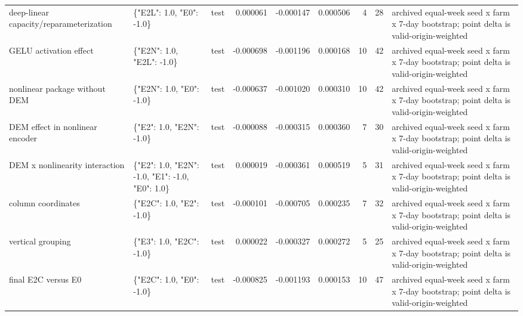 \begin{tabular}{lllrrrrrl}
deep-linear capacity/reparameterization & \{"E2L": 1.0, "E0": -1.0\} & test & 0.000061 & -0.000147 & 0.000506 & 4 & 28 & archived equal-week seed x farm x 7-day bootstrap; point delta is valid-origin-weighted \\
GELU activation effect & \{"E2N": 1.0, "E2L": -1.0\} & test & -0.000698 & -0.001196 & 0.000168 & 10 & 42 & archived equal-week seed x farm x 7-day bootstrap; point delta is valid-origin-weighted \\
nonlinear package without DEM & \{"E2N": 1.0, "E0": -1.0\} & test & -0.000637 & -0.001020 & 0.000310 & 10 & 42 & archived equal-week seed x farm x 7-day bootstrap; point delta is valid-origin-weighted \\
DEM effect in nonlinear encoder & \{"E2": 1.0, "E2N": -1.0\} & test & -0.000088 & -0.000315 & 0.000360 & 7 & 30 & archived equal-week seed x farm x 7-day bootstrap; point delta is valid-origin-weighted \\
DEM x nonlinearity interaction & \{"E2": 1.0, "E2N": -1.0, "E1": -1.0, "E0": 1.0\} & test & 0.000019 & -0.000361 & 0.000519 & 5 & 31 & archived equal-week seed x farm x 7-day bootstrap; point delta is valid-origin-weighted \\
column coordinates & \{"E2C": 1.0, "E2": -1.0\} & test & -0.000101 & -0.000705 & 0.000235 & 7 & 32 & archived equal-week seed x farm x 7-day bootstrap; point delta is valid-origin-weighted \\
vertical grouping & \{"E3": 1.0, "E2C": -1.0\} & test & 0.000022 & -0.000327 & 0.000272 & 5 & 25 & archived equal-week seed x farm x 7-day bootstrap; point delta is valid-origin-weighted \\
final E2C versus E0 & \{"E2C": 1.0, "E0": -1.0\} & test & -0.000825 & -0.001193 & 0.000153 & 10 & 47 & archived equal-week seed x farm x 7-day bootstrap; point delta is valid-origin-weighted \\
\bottomrule
\end{tabular}
